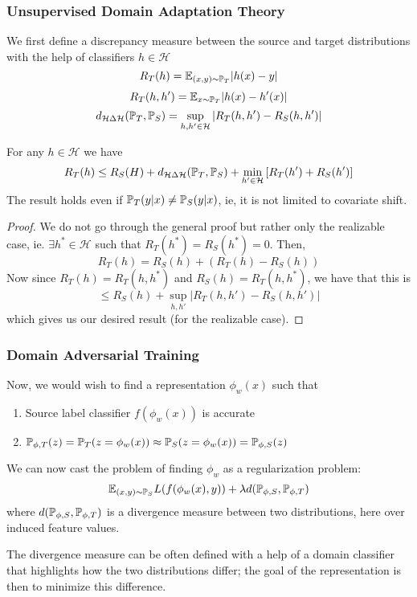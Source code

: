 \documentclass[11pt]{scrartcl}
\begin{document}
\subsubsection{Unsupervised Domain Adaptation Theory}
We first define a discrepancy measure between the source and target distributions with the help of classifiers $h \in \mathcal{H}$ $$R_T(h)=\mathbb{E}_{(x,y) \sim \mathbb{P}_T}|h(x)-y|$$
$$R_T(h,h')=\mathbb{E}_{x \sim \mathbb{P}_{T}}|h(x)-h'(x)|$$
$$d_{\mathcal{H}\Delta\mathcal{H}}(\mathbb{P}_T,\mathbb{P}_S) = \sup_{h,h' \in \mathcal{H}} |R_T(h,h')-R_S(h,h')|$$
\begin{thm}
For any $h \in \mathcal{H}$ we have
$$R_T(h) \le R_S(H)+d_{\mathcal{H}\Delta\mathcal{H}}(\mathbb{P}_T,\mathbb{P}_S)+\min_{h' \in \mathcal{H}}\left[R_T(h')+R_S(h')\right]$$
The result holds even if $\mathbb{P}_T(y|x) \ne \mathbb{P}_S(y|x)$, ie, it is not limited to covariate shift. 
\end{thm}
\begin{proof}
We do not go through the general proof but rather only the realizable case, ie. $\exists{h^*} \in \mathcal{H}$ such that $R_T(h^*)=R_S(h^*)=0$. Then, 
$$R_T(h)=R_S(h)+(R_T(h)-R_S(h))$$
Now since $R_T(h)=R_T(h,h^*)$ and $R_S(h)=R_T(h,h^*)$, we have that this is 
$$\le R_S(h)+\sup_{h,h'}|R_T(h,h')-R_S(h,h')|$$
which gives us our desired result (for the realizable case).  
\end{proof}

\subsubsection{Domain Adversarial Training}
Now, we would wish to find a representation $\phi_w(x)$ such that 
\begin{enumerate}[label=(\arabic*)]
    \item Source label classifier $f(\phi_w(x))$ is accurate
    \item $\mathbb{P}_{\phi,T}(z)=\mathbb{P}_{T}(z=\phi_w(x)) \approx \mathbb{P}_S(z=\phi_w(x))=\mathbb{P}_{\phi,S}(z)$
\end{enumerate}
We can now cast the problem of finding $\phi_w$ as a regularization problem: 
$$\mathbb{E}_{(x,y) \sim \mathbb{P}_S}L(f(\phi_w(x),y))+\lambda{d}(\mathbb{P}_{\phi,S},\mathbb{P}_{\phi,T})$$ where $d(\mathbb{P}_{\phi,S},\mathbb{P}_{\phi,T})$ is a divergence measure between two distributions, here over induced feature values. 

The divergence measure can be often defined with a help of a domain classifier that highlights how the two distributions differ; the goal of the representation is then to minimize this difference.
\end{document}

